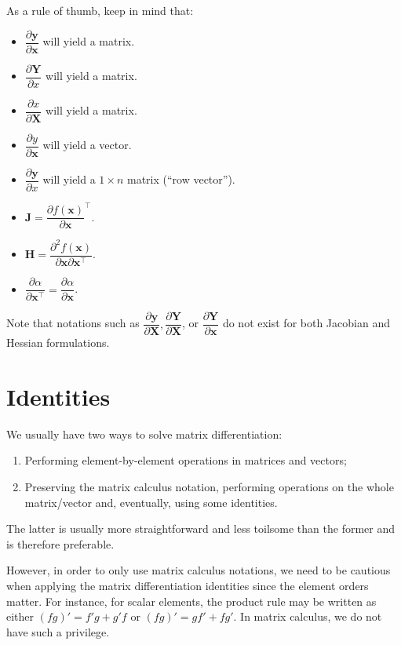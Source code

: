 \documentclass{article}
\begin{document}
As a rule of thumb, keep in mind that:
\begin{itemize}
    \item \(\dfrac{\partial \mathbf{y}}{\partial \mathbf{x}}\) will yield a matrix.
    \item \(\dfrac{\partial \mathbf{Y}}{\partial x}\) will yield a matrix.
    \item \(\dfrac{\partial x}{\partial \mathbf{X}}\) will yield a matrix.
    \item \(\dfrac{\partial y}{\partial \mathbf{x}}\) will yield a vector.
    \item \(\dfrac{\partial \mathbf{y}}{\partial x}\) will yield a \(1\times n\) matrix (``row vector'').
    \item \(\mathbf{J} = \dfrac{\partial f(\mathbf{x})}{\partial \mathbf{x}}^\top\).
    \item \(\mathbf{H} = \dfrac{\partial^{2} f(\mathbf{x})}{\partial \mathbf{x} \partial \mathbf{x}^\top}\).
    \item \(\dfrac{\partial\alpha}{\partial \mathbf{x}^\top} = \dfrac{\partial\alpha}{\partial \mathbf{x}}\).
\end{itemize}

Note that notations such as \(\dfrac{\partial \mathbf{y}}{\partial \mathbf{X}}, \dfrac{\partial \mathbf{Y}}{\partial \mathbf{X}}\), or \(\dfrac{\partial \mathbf{Y}}{\partial \mathbf{x}}\) do not exist for both Jacobian and Hessian formulations.

\section{Identities}

We usually have two ways to solve matrix differentiation:
\begin{enumerate}
    \item Performing element-by-element operations in matrices and vectors;
    \item Preserving the matrix calculus notation, performing operations on the whole matrix/vector and, eventually, using some identities.
\end{enumerate}
The latter is usually more straightforward and less toilsome than the former and is therefore preferable.

However, in order to only use matrix calculus notations, we need to be cautious when applying the matrix differentiation identities since the element orders matter. For instance, for scalar elements, the product rule may be written as either \((fg)' = f'g + g'f\) or \((fg)' = g f' + f g'\). In matrix calculus, we do not have such a privilege.
\end{document}
